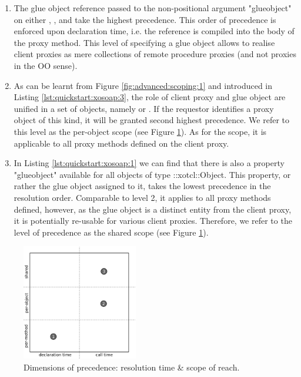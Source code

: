 \begin{enumerate}
\item The glue object reference passed to the non-positional argument "glueobject" on either , ,  and  take the highest precedence. This order of precedence is enforced upon declaration time, i.e. the reference is compiled into the body of the proxy method. This level of specifying a glue object allows to realise client proxies as mere collections of remote procedure proxies (and not proxies in the OO sense).
\item As can be learnt from Figure \ref{fig:advanced:scoping:1} and introduced in Listing \ref{lst:quickstart:xosoap:3}, the role of client proxy and glue object are unified in a set of objects, namely  or  . If the requestor identifies a proxy object of this kind, it will be granted second highest precedence. We refer to this level as the per-object scope (see Figure \ref{fig:advanced:scoping:2}). As for the scope, it is applicable to all proxy methods defined on the client proxy.
\item In Listing \ref{lst:quickstart:xosoap:1} we can find that there is also a property "glueobject" available for all objects of type ::xotcl::Object. This property, or rather the glue object assigned to it, takes the lowest precedence in the resolution order. Comparable to level 2, it applies to all proxy methods defined, however, as the glue object is a distinct entity from the client proxy, it is potentially re-usable for various client proxies. Therefore, we refer to the level of precedence as the shared scope (see Figure \ref{fig:advanced:scoping:2}).
\end{enumerate}
  \begin{figure}[htbp]
\begin{center}
\includegraphics[width=0.45\textwidth]{img/scoping-glue-objects-scheme.png}
\caption{Dimensions of precedence: resolution time \& scope of reach.}
\label{fig:advanced:scoping:2}
\end{center}
\end{figure}
